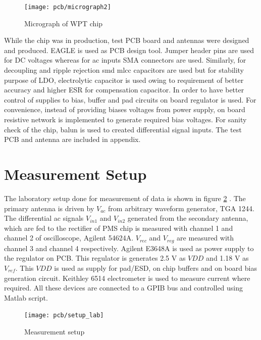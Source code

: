 \documentclass[12pt,a4paper,UKenglish]{report}
\begin{document}
\begin{figure} [!htb]
  \centering
  \texttt{[image: pcb/micrograph2]} 
 \caption{Micrograph of WPT chip} 
\label{fig:micrograph} 
\end{figure}


While the chip was in production, test PCB board and antennas were designed and produced. EAGLE is used as PCB design tool. Jumper header pins are used for DC voltages whereas for ac inputs SMA connectors are used. Similarly, for decoupling and ripple rejection \acrshort{smd} \acrshort{mlcc} capacitors are used but  for stability purpose of LDO, electrolytic capacitor is used owing to requirement of better accuracy and higher ESR for compensation capacitor.  In order to have better control of supplies to bias, buffer and pad circuits on board regulator is used. For convenience, instead of providing biases voltages from power supply, on board resistive network is implemented to generate required bias voltages. For sanity check of the chip, balun is used to created differential signal inputs. The test PCB and antenna are included in appendix.\\

\section{Measurement Setup} %

The laboratory setup done for measurement of data is shown in figure \ref{fig:lab_setup} . The primary antenna is driven by $V_{ac}$ 
from arbitrary waveform generator, TGA 1244. The differential ac signals  $V_{in1}$ and $V_{in2}$ generated from the 
secondary antenna, which are fed to the rectifier of PMS chip is measured with channel 1 and channel 2 of oscilloscope,
Agilent 54624A. $V_{rec}$ and $V_{reg}$ are measured with channel 3 and channel 4 respectively. Agilent E3648A is used as 
power supply to the regulator on PCB. This regulator is generates 2.5 V as $VDD$ and 1.18 V as $V_{ref}$. This $VDD$ is 
used as supply for pad/ESD, on chip buffers and on board bias generation circuit. Keithley 6514 electrometer is used to 
measure current where required. All these devices are connected to a GPIB bus and controlled using Matlab script.

\begin{figure} [H]
  \centering
  \texttt{[image: pcb/setup\_lab]} 
 \caption{Measurement setup} 
\label{fig:lab_setup} 
\end{figure}
\end{document}

